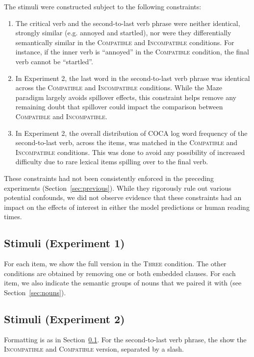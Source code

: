 \documentclass[11pt,a4paper]{article}
\begin{document}
The stimuli were constructed subject to the following constraints:
\begin{enumerate}
	\item The critical verb and the second-to-last verb phrase were neither identical, strongly similar (e.g. annoyed and startled), nor were they differentially semantically similar in the \textsc{Compatible} and \textsc{Incompatible} conditions. For instance, if the inner verb is ``annoyed'' in the \textsc{Compatible} condition, the final verb cannot be ``startled''.
	\item In Experiment 2, the last word in the second-to-last verb phrase was identical across the \textsc{Compatible} and \textsc{Incompatible} conditions.
		While the Maze paradigm largely avoids spillover effects, this constraint helps remove any remaining doubt that spillover could impact the comparison between \textsc{Compatible} and \textsc{Incompatible}.
	\item In Experiment 2, the overall distribution of COCA log word frequency of the second-to-last verb, across the items, was matched in the \textsc{Compatible} and \textsc{Incompatible} conditions. This was done to avoid any possibility of increased difficulty due to rare lexical items spilling over to the final verb.
\end{enumerate}
These constraints had not been consistently enforced in the preceding experiments (Section~\ref{sec:previous}).
While they rigorously rule out various potential confounds, we did not observe evidence that these constraints had an impact on the effects of interest in either the model predictions or human reading times.



\subsection{Stimuli (Experiment 1)}\label{sec:stimulus-pool-1}

For each item, we show the full version in the \textsc{Three} condition.
The other conditions are obtained by removing one or both embedded clauses.
For each item, we also indicate the semantic groups of nouns that we paired it with (see Section~\ref{sec:nouns}).








\subsection{Stimuli (Experiment 2)}\label{sec:stimulus-pool-2}
Formatting is as in Section~\ref{sec:stimulus-pool-1}.
For the second-to-last verb phrase, the show the \textsc{Incompatible} and \textsc{Compatible} version, separated by a slash.
\end{document}
